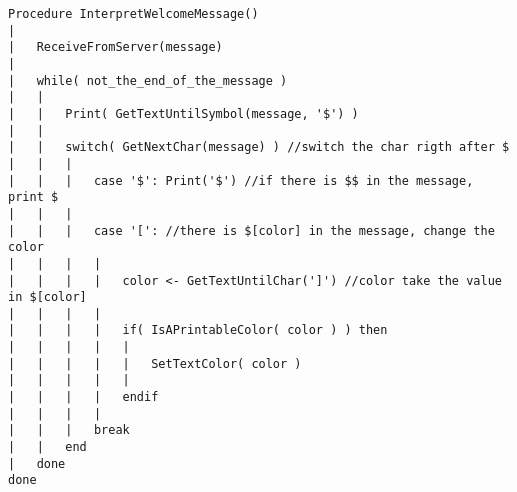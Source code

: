 \begin{lstlisting}
Procedure InterpretWelcomeMessage()
|	
|	ReceiveFromServer(message)
|	
|	while( not_the_end_of_the_message )
|	|	
|	|	Print( GetTextUntilSymbol(message, '$') )
|	|	
|	|	switch( GetNextChar(message) ) //switch the char rigth after $
|	|	|	
|	|	|	case '$': Print('$') //if there is $$ in the message, print $
|	|	|	
|	|	|	case '[': //there is $[color] in the message, change the color
|	|	|	|	
|	|	|	|	color <- GetTextUntilChar(']') //color take the value in $[color]
|	|	|	|	
|	|	|	|	if( IsAPrintableColor( color ) ) then
|	|	|	|	|
|	|	|	|	|	SetTextColor( color )
|	|	|	|	|
|	|	|	|	endif
|	|	|	|	
|	|	|	break
|	|	end
|	done
done
\end{lstlisting}
